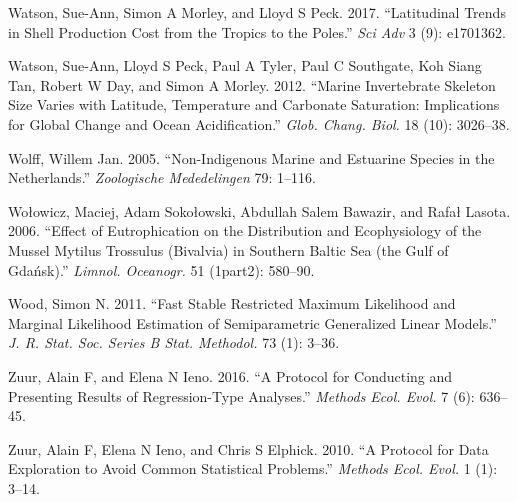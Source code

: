 \documentclass[smallextended]{svjour3}       %
\newlength{\cslhangindent}
\newenvironment{CSLReferences}[2] %
 {%
  \setlength{\parindent}{0pt}
  \ifodd #1 \everypar{\setlength{\hangindent}{\cslhangindent}}\ignorespaces\fi
  \ifnum #2 > 0
  \setlength{\parskip}{#2\baselineskip}
  \fi
 }%
 {}
\begin{document}
\begin{CSLReferences}{1}{0}
\leavevmode{}%
Watson, Sue-Ann, Simon A Morley, and Lloyd S Peck. 2017. {``Latitudinal
Trends in Shell Production Cost from the Tropics to the Poles.''}
\emph{Sci Adv} 3 (9): e1701362.

\leavevmode{}%
Watson, Sue-Ann, Lloyd S Peck, Paul A Tyler, Paul C Southgate, Koh Siang
Tan, Robert W Day, and Simon A Morley. 2012. {``Marine Invertebrate
Skeleton Size Varies with Latitude, Temperature and Carbonate
Saturation: Implications for Global Change and Ocean Acidification.''}
\emph{Glob. Chang. Biol.} 18 (10): 3026--38.

\leavevmode{}%
Wolff, Willem Jan. 2005. {``Non-Indigenous Marine and Estuarine Species
in the Netherlands.''} \emph{Zoologische Mededelingen} 79: 1--116.

\leavevmode{}%
Wołowicz, Maciej, Adam Sokołowski, Abdullah Salem Bawazir, and Rafał
Lasota. 2006. {``Effect of Eutrophication on the Distribution and
Ecophysiology of the Mussel Mytilus Trossulus (Bivalvia) in Southern
Baltic Sea (the Gulf of Gda{ń}sk).''} \emph{Limnol. Oceanogr.} 51
(1part2): 580--90.

\leavevmode{}%
Wood, Simon N. 2011. {``Fast Stable Restricted Maximum Likelihood and
Marginal Likelihood Estimation of Semiparametric Generalized Linear
Models.''} \emph{J. R. Stat. Soc. Series B Stat. Methodol.} 73 (1):
3--36.

\leavevmode{}%
Zuur, Alain F, and Elena N Ieno. 2016. {``A Protocol for Conducting and
Presenting Results of Regression-Type Analyses.''} \emph{Methods Ecol.
Evol.} 7 (6): 636--45.

\leavevmode{}%
Zuur, Alain F, Elena N Ieno, and Chris S Elphick. 2010. {``A Protocol
for Data Exploration to Avoid Common Statistical Problems.''}
\emph{Methods Ecol. Evol.} 1 (1): 3--14.

\end{CSLReferences}




\end{document}
